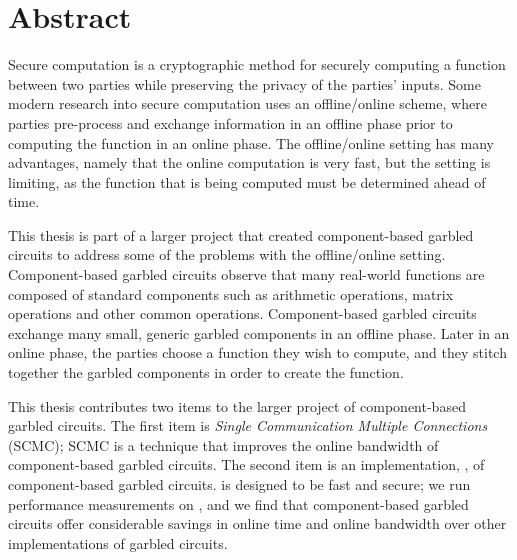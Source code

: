 
\chapter*{Abstract}

Secure computation is a cryptographic method for securely computing a function between two parties while preserving the privacy of the parties' inputs.
Some modern research into secure computation uses an offline/online scheme, where parties pre-process and exchange information in an offline phase prior to computing the function in an online phase. 
The offline/online setting has many advantages, namely that the online computation is very fast, but the setting is limiting, as the function that is being computed must be determined ahead of time.

This thesis is part of a larger project that created component-based garbled circuits to address some of the problems with the offline/online setting.
Component-based garbled circuits observe that many real-world functions are composed of standard components such as arithmetic operations, matrix operations and other common operations.
Component-based garbled circuits exchange many small, generic garbled components in an offline phase. 
Later in an online phase, the parties choose a function they wish to compute, and they stitch together the garbled components in order to create the function.

This thesis contributes two items to the larger project of component-based garbled circuits.
The first item is \textit{Single Communication Multiple Connections} (SCMC); SCMC is a technique that improves the online bandwidth of component-based garbled circuits.
The second item is an implementation, \CompGC, of component-based garbled circuits.
\CompGC is designed to be fast and secure; we run performance measurements on \CompGC, and we find that component-based garbled circuits offer considerable savings in online time and online bandwidth over other implementations of garbled circuits. 
